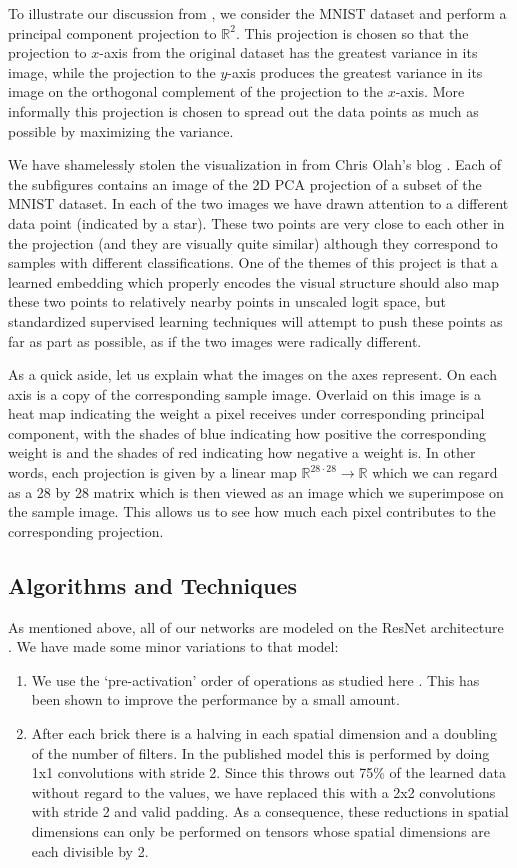 \documentclass[english,a4paper,oneside]{amsart}
\theoremstyle{definition}
\begin{document}
To illustrate our discussion from , we consider the MNIST dataset and perform a principal component projection to $\mathbb{R}^2$. This projection is chosen so that the projection to $x$-axis  from the original dataset has the greatest variance in its image, while the projection to the $y$-axis produces the greatest variance in its image on the orthogonal complement of the  projection to the $x$-axis. More informally this projection is chosen to spread out the data points as much as possible by maximizing the variance.

We have shamelessly stolen the visualization in  from Chris Olah's blog \cite{VisMNIST}. Each of the subfigures contains an image of the 2D PCA projection of a subset of the MNIST dataset. In each of the two images we have drawn attention to a different data point (indicated by a star). These two points are very close to each other in the projection (and they are visually quite similar) although they correspond to samples with different classifications.  One of the themes of this project is that a learned embedding which properly encodes the visual structure should also map these two points to relatively nearby points in unscaled logit space, but standardized supervised learning techniques will attempt to push these points as far as part as possible, as if the two images were radically different.

As a quick aside, let us explain what the images on the axes represent. On each axis is a copy of the corresponding sample image. Overlaid on this image is a heat map indicating the weight a pixel receives under corresponding principal component, with the shades of blue indicating how positive the corresponding weight is and the shades of red indicating how negative a weight is. In other words, each projection is given by a linear map $\mathbb{R}^{28\cdot 28}\to \mathbb{R}$ which we can regard as a 28 by 28 matrix which is then viewed as an image which we superimpose on the sample image. This allows us to see how much each pixel contributes to the corresponding projection.
\subsection{Algorithms and Techniques}
As mentioned above, all of our networks are modeled on the ResNet architecture \cite{ResNet}. We have made some minor variations to that model:
\begin{enumerate}
	\item We use the `pre-activation' order of operations as studied here \cite{Preactive}. This has been shown to improve the performance by a small amount.
	\item After each brick there is a halving in each spatial dimension and a doubling of the number of filters. In the published model this is performed by doing 1x1 convolutions with stride 2. Since this throws out 75\% of the learned data without regard to the values, we have replaced this with a 2x2 convolutions with stride 2 and valid padding. As a consequence, these reductions in spatial dimensions can only be performed on tensors  whose spatial dimensions are each divisible by 2.
\end{enumerate}
\end{document}
